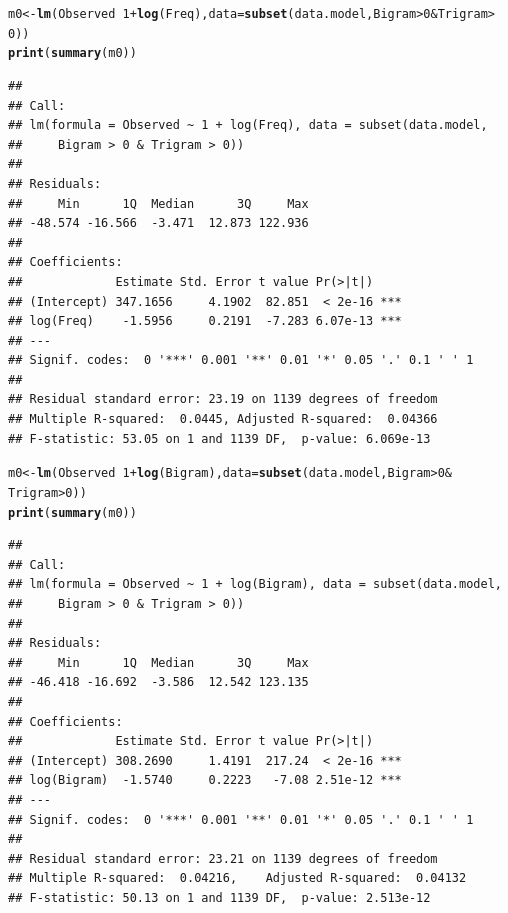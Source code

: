 \documentclass{article}\usepackage[]{graphicx}\usepackage[]{color}
\makeatletter
\newcommand{\hlnum}[1]{\textcolor[rgb]{0.686,0.059,0.569}{#1}}%
\newcommand{\hlopt}[1]{\textcolor[rgb]{0,0,0}{#1}}%
\newcommand{\hlstd}[1]{\textcolor[rgb]{0.345,0.345,0.345}{#1}}%
\newcommand{\hlkwb}[1]{\textcolor[rgb]{0.69,0.353,0.396}{#1}}%
\newcommand{\hlkwc}[1]{\textcolor[rgb]{0.333,0.667,0.333}{#1}}%
\newcommand{\hlkwd}[1]{\textcolor[rgb]{0.737,0.353,0.396}{\textbf{#1}}}%
\newenvironment{kframe}{%
 \def\at@end@of@kframe{}%
 \ifinner\ifhmode%
  \def\at@end@of@kframe{\end{minipage}}%
  \begin{minipage}{\columnwidth}%
 \fi\fi%
 \def\FrameCommand##1{\hskip\@totalleftmargin \hskip-\fboxsep
 \colorbox{shadecolor}{##1}\hskip-\fboxsep
     \hskip-\linewidth \hskip-\@totalleftmargin \hskip\columnwidth}%
 \MakeFramed {\advance\hsize-\width
   \@totalleftmargin\z@ \linewidth\hsize
   \@setminipage}}%
 {\par\unskip\endMakeFramed%
 \at@end@of@kframe}
\newenvironment{knitrout}{}{} %
\makeatother
\begin{document}
\begin{knitrout}
\color{fgcolor}\begin{kframe}
\begin{alltt}
\hlstd{m0} \hlkwb{<-} \hlkwd{lm}\hlstd{(Observed} \hlopt{~} \hlnum{1} \hlopt{+} \hlkwd{log}\hlstd{(Freq),} \hlkwc{data} \hlstd{=} \hlkwd{subset}\hlstd{(data.model, Bigram} \hlopt{>} \hlnum{0} \hlopt{&} \hlstd{Trigram} \hlopt{>}
    \hlnum{0}\hlstd{))}
\hlkwd{print}\hlstd{(}\hlkwd{summary}\hlstd{(m0))}
\end{alltt}
\begin{verbatim}
## 
## Call:
## lm(formula = Observed ~ 1 + log(Freq), data = subset(data.model, 
##     Bigram > 0 & Trigram > 0))
## 
## Residuals:
##     Min      1Q  Median      3Q     Max 
## -48.574 -16.566  -3.471  12.873 122.936 
## 
## Coefficients:
##             Estimate Std. Error t value Pr(>|t|)    
## (Intercept) 347.1656     4.1902  82.851  < 2e-16 ***
## log(Freq)    -1.5956     0.2191  -7.283 6.07e-13 ***
## ---
## Signif. codes:  0 '***' 0.001 '**' 0.01 '*' 0.05 '.' 0.1 ' ' 1
## 
## Residual standard error: 23.19 on 1139 degrees of freedom
## Multiple R-squared:  0.0445,	Adjusted R-squared:  0.04366 
## F-statistic: 53.05 on 1 and 1139 DF,  p-value: 6.069e-13
\end{verbatim}
\begin{alltt}
\hlstd{m0} \hlkwb{<-} \hlkwd{lm}\hlstd{(Observed} \hlopt{~} \hlnum{1} \hlopt{+} \hlkwd{log}\hlstd{(Bigram),} \hlkwc{data} \hlstd{=} \hlkwd{subset}\hlstd{(data.model, Bigram} \hlopt{>} \hlnum{0} \hlopt{&}
    \hlstd{Trigram} \hlopt{>} \hlnum{0}\hlstd{))}
\hlkwd{print}\hlstd{(}\hlkwd{summary}\hlstd{(m0))}
\end{alltt}
\begin{verbatim}
## 
## Call:
## lm(formula = Observed ~ 1 + log(Bigram), data = subset(data.model, 
##     Bigram > 0 & Trigram > 0))
## 
## Residuals:
##     Min      1Q  Median      3Q     Max 
## -46.418 -16.692  -3.586  12.542 123.135 
## 
## Coefficients:
##             Estimate Std. Error t value Pr(>|t|)    
## (Intercept) 308.2690     1.4191  217.24  < 2e-16 ***
## log(Bigram)  -1.5740     0.2223   -7.08 2.51e-12 ***
## ---
## Signif. codes:  0 '***' 0.001 '**' 0.01 '*' 0.05 '.' 0.1 ' ' 1
## 
## Residual standard error: 23.21 on 1139 degrees of freedom
## Multiple R-squared:  0.04216,	Adjusted R-squared:  0.04132 
## F-statistic: 50.13 on 1 and 1139 DF,  p-value: 2.513e-12
\end{verbatim}
\begin{alltt}

\end{alltt}
\end{kframe}
\end{knitrout}
\end{document}
